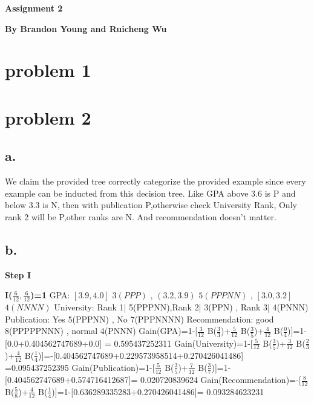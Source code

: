 \documentclass[12pt, letterpaper]{article}
\begin{document}
	\textbf{\large Assignment 2}\newline
	
	\textbf{By Brandon Young and Ruicheng Wu}
	\section{problem 1}
	
	\pagebreak
	\section{problem 2}
	\subsection{a.}
	
	We claim the provided tree correctly categorize the provided example since every example can be inducted from this decision tree.
	Like GPA above 3.6 is P and below 3.3 is N, then with publication P,otherwise check University Rank, Only rank 2 will be P,other ranks are N. And recommendation doesn't matter.
	
	\subsection{b.}\large
	\textbf{Step I}
	
	\textbf{I($\frac{6}{12},\frac{6}{12}$)=1}\newline
	GPA: $[3.9,4.0]$ $3(PPP)$ , $(3.2,3.9)$ $5(PPPNN)$ , $[3.0,3.2]$ $4(NNNN)$\newline
	University: Rank 1| 5(PPPNN),Rank 2| 3(PPN) , Rank 3| 4(PNNN)\newline
	Publication: Yes 5(PPPNN) , No 7(PPPNNNN)\newline
	Recommendation: good 8(PPPPPNNN) , normal 4(PNNN)\newline\newline
	Gain(GPA)=1-[$\frac{3}{12}$ B($\frac{3}{3}$)+$\frac{5}{12}$ B($\frac{3}{5}$)+$\frac{4}{12}$ B($\frac{0}{4}$)]=1-[0.0+0.404562747689+0.0]
	= 0.595437252311\newline\newline
	Gain(University)=1-[$\frac{5}{12}$ B($\frac{3}{5}$)+$\frac{3}{12}$ B($\frac{2}{3}$)+$\frac{4}{12}$ B($\frac{1}{4}$)]=-[0.404562747689+0.229573958514+0.270426041486] =0.095437252395\newline\newline
	Gain(Publication)=1-[$\frac{5}{12}$ B($\frac{3}{5}$)+$\frac{7}{12}$ B($\frac{3}{7}$)]=1-[0.404562747689+0.574716412687]= 0.020720839624\newline\newline
	Gain(Recommendation)=-[$\frac{8}{12}$ B($\frac{5}{8}$)+$\frac{4}{12}$ B($\frac{1}{4}$)]=1-[0.636289335283+0.270426041486]= 0.093284623231\newline
	
\end{document}
